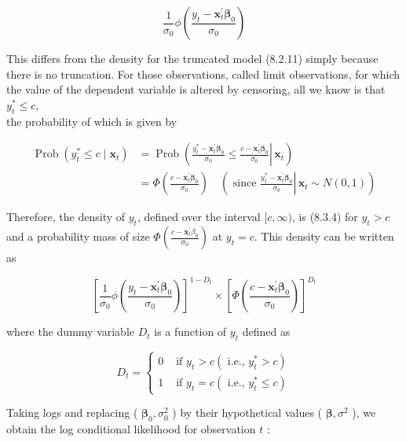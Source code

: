 \documentclass[10pt]{article}
\begin{document}
\begin{equation*}
\frac{1}{\sigma_{0}} \phi\left(\frac{y_{t}-\mathbf{x}_{t}^{\prime} \boldsymbol{\beta}_{0}}{\sigma_{0}}\right) \tag{8.3.4}
\end{equation*}


This differs from the density for the truncated model (8.2.11) simply because there is no truncation. For those observations, called limit observations, for which the value of the dependent variable is altered by censoring, all we know is that $y_{t}^{*} \leq c$,\\
the probability of which is given by


\begin{align*}
\operatorname{Prob}\left(y_{t}^{*} \leq c \mid \mathbf{x}_{t}\right) & =\operatorname{Prob}\left(\left.\frac{y_{t}^{*}-\mathbf{x}_{t}^{\prime} \boldsymbol{\beta}_{0}}{\sigma_{0}} \leq \frac{c-\mathbf{x}_{t}^{\prime} \boldsymbol{\beta}_{0}}{\sigma_{0}} \right\rvert\, \mathbf{x}_{t}\right) \\
& =\Phi\left(\frac{c-\mathbf{x}_{t}^{\prime} \boldsymbol{\beta}_{0}}{\sigma_{0}}\right) \quad\left(\text { since } \left.\frac{y_{t}^{*}-\mathbf{x}_{t}^{\prime} \boldsymbol{\beta}_{0}}{\sigma_{0}} \right\rvert\, \mathbf{x}_{t} \sim N(0,1)\right) \tag{8.3.5}
\end{align*}


Therefore, the density of $y_{t}$, defined over the interval $[c, \infty)$, is (8.3.4) for $y_{t}>c$ and a probability mass of size $\Phi\left(\frac{c-\mathbf{x}_{t}^{\prime} \beta_{0}}{\sigma_{0}}\right)$ at $y_{t}=c$. This density can be written as


\begin{equation*}
\left[\frac{1}{\sigma_{0}} \phi\left(\frac{y_{t}-\mathbf{x}_{t}^{\prime} \boldsymbol{\beta}_{0}}{\sigma_{0}}\right)\right]^{1-D_{t}} \times\left[\Phi\left(\frac{c-\mathbf{x}_{t}^{\prime} \boldsymbol{\beta}_{0}}{\sigma_{0}}\right)\right]^{D_{t}} \tag{8.3.6}
\end{equation*}


where the dummy variable $D_{t}$ is a function of $y_{t}$ defined as

\[
D_{t}= \begin{cases}0 & \text { if } y_{t}>c\left(\text { i.e., } y_{t}^{*}>c\right)  \tag{8.3.7}\\ 1 & \text { if } y_{t}=c\left(\text { i.e., } y_{t}^{*} \leq c\right)\end{cases}
\]

Taking logs and replacing ( $\boldsymbol{\beta}_{0}, \sigma_{0}^{2}$ ) by their hypothetical values ( $\boldsymbol{\beta}, \sigma^{2}$ ), we obtain the log conditional likelihood for observation $t$ :
\end{document}
